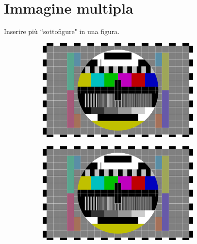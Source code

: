 \section{Immagine multipla}

Inserire più ``sottofigure" in una figura.
\begin{figure}[!ht]
    \centering
    
	\begin{subfigure}{0.49\textwidth} %
		\includegraphics[width=0.9\textwidth]{images/cap2/test} 
		\caption{}
	\end{subfigure}
	\begin{subfigure}{0.49\textwidth}
		\includegraphics[width=0.9\textwidth]{images/cap2/test}
		\caption{}
	\end{subfigure}
	

\end{figure}
